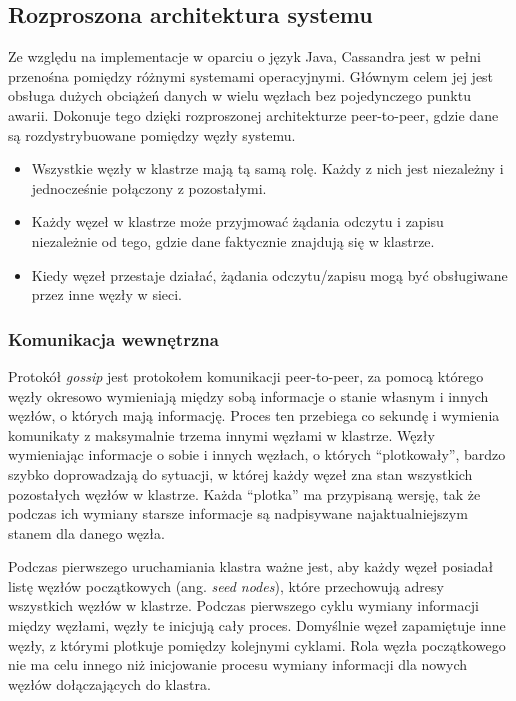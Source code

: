 \subsection{Rozproszona architektura systemu}

Ze względu na implementacje w oparciu o język Java, Cassandra jest w pełni przenośna pomiędzy różnymi systemami operacyjnymi. 
Głównym celem jej jest obsługa dużych obciążeń danych w wielu węzłach bez pojedynczego punktu awarii.
Dokonuje tego dzięki rozproszonej architekturze peer-to-peer, gdzie dane są rozdystrybuowane pomiędzy węzły systemu.
\begin{itemize}
    \item Wszystkie węzły w klastrze mają tą samą rolę. Każdy z nich jest niezależny i jednocześnie połączony z pozostałymi.
    \item Każdy węzeł w klastrze może przyjmować żądania odczytu i zapisu niezależnie od tego, gdzie dane faktycznie znajdują się w klastrze.
    \item Kiedy węzeł przestaje działać, żądania odczytu/zapisu mogą być obsługiwane przez inne węzły w sieci.
\end{itemize}

\subsubsection{Komunikacja wewnętrzna}

Protokół \textit{gossip} jest protokołem komunikacji peer-to-peer, za pomocą którego węzły okresowo wymieniają między sobą informacje o stanie własnym i innych węzłów, o których mają informację. 
Proces ten przebiega co sekundę i wymienia komunikaty z maksymalnie trzema innymi węzłami w klastrze.
Węzły wymieniając informacje o sobie i innych węzłach, o których \enquote{plotkowały}, bardzo szybko doprowadzają do sytuacji, w której każdy węzeł zna stan wszystkich pozostałych węzłów w klastrze.
Każda \enquote{plotka} ma przypisaną wersję, tak że podczas ich wymiany starsze informacje są nadpisywane najaktualniejszym stanem dla danego węzła. 

Podczas pierwszego uruchamiania klastra ważne jest, aby każdy węzeł posiadał listę węzłów początkowych (ang. \textit{seed nodes}), które przechowują adresy wszystkich węzłów w klastrze.
Podczas pierwszego cyklu wymiany informacji między węzłami, węzły te inicjują cały proces.
Domyślnie węzeł zapamiętuje inne węzły, z którymi plotkuje pomiędzy kolejnymi cyklami.
Rola węzła początkowego nie ma celu innego niż inicjowanie procesu wymiany informacji dla nowych węzłów dołączających do klastra.

